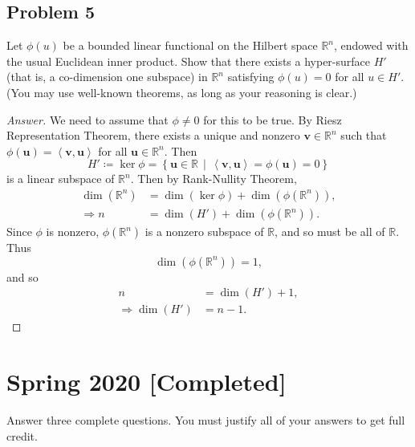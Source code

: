 \documentclass[12pt]{article}
\newcommand{\real}{\mathbb{R}}
\newcommand\paren[1]{\left( #1 \right)}
\newcommand\setb[1]{\left \{ #1 \right \}}
\newcommand{\vbrack}[1]{\left \langle #1 \right \rangle}
\theoremstyle{definition}
\begin{document}
\subsection{Problem 5 \texorpdfstring{\cite{Rudin}}{}}
Let $\phi(u)$ be a bounded linear functional on the Hilbert space $\real^n$, endowed with the usual Euclidean inner product. Show that there exists a hyper-surface $H'$ (that is, a co-dimension one subspace) in $\real^n$ satisfying $\phi(u) = 0$ for all $u \in H'$. (You may use well-known theorems, as long as your reasoning is clear.)

\begin{proof}[Answer]
    We need to assume that $\phi \neq 0$ for this to be true. By Riesz Representation Theorem, there exists a unique and nonzero $\mathbf{v} \in \real^n$ such that $\phi(\mathbf{u}) = \vbrack{ \mathbf{v} , \mathbf{u} }$ for all $\mathbf{u} \in \real^n$. Then 
    \[
        H' \coloneqq \ker \phi = \setb{ \mathbf{u} \in \real \, \middle| \, \vbrack{ \mathbf{v} , \mathbf{u} } = \phi(\mathbf{u}) = 0 }
    \]
    is a linear subspace of $\real^n$. Then by Rank-Nullity Theorem, 
    \begin{align*}
        \dim \paren{ \real^n } & = \dim \paren{ \ker\phi } + \dim \paren{ \phi \paren{ \real^n } } , \\ 
        \Rightarrow n & = \dim \paren{ H' } + \dim \paren{ \phi \paren{ \real^n } } . 
    \end{align*}
    Since $\phi$ is nonzero, $\phi \paren{ \real^n }$ is a nonzero subspace of $\real$, and so must be all of $\real$. Thus 
    \[
        \dim \paren{ \phi \paren{ \real^n } } = 1 , 
    \]
    and so 
    \begin{align*}
        n & = \dim \paren{ H' } + 1 , \\ 
        \Rightarrow \dim \paren{ H' } & = n - 1 . 
    \end{align*}
\end{proof}

\newpage
\section{Spring 2020 [Completed]}
Answer three complete questions. You must justify all of your answers to get full credit.
\end{document}
